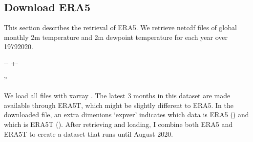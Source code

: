 \documentclass[letterpaper,10pt,english]{sphinxmanual}
\newlength\nbsphinxcodecellspacing
\begin{document}
\subsection{Download ERA5}
\label{\detokenize{Notebooks/Global_monthly_temperature_records_ERA5:Download-ERA5}}
This section describes the retrieval of ERA5. We retrieve netcdf files of global monthly 2m temperature and 2m dewpoint temperature for each year over 1979\sphinxhyphen{}2020.

{
\begin{sphinxVerbatim}[commandchars=\\\{\}]
\llap{\color{nbsphinxin}[39]:\,\hspace{\fboxrule}\hspace{\fboxsep}}  \PYG{p}{[}\PYG{p}{]}   
\end{sphinxVerbatim}
}

{

\kern-\sphinxverbatimsmallskipamount\kern-\baselineskip
\kern+\FrameHeightAdjust\kern-\fboxrule
\vspace{\nbsphinxcodecellspacing}

\begin{sphinxVerbatim}[commandchars=\\\{\}]
\llap{\color{nbsphinxout}[39]:\,\hspace{\fboxrule}\hspace{\fboxsep}}''
\end{sphinxVerbatim}
}

We load all files with xarray . The latest 3 months in this dataset are made available through ERA5T, which might be slightly different to ERA5. In the downloaded file, an extra dimenions ‘expver’ indicates which data is ERA5 () and which is ERA5T (). After retrieving and loading, I combine both ERA5 and ERA5T to create a dataset that runs until August 2020.
\end{document}
